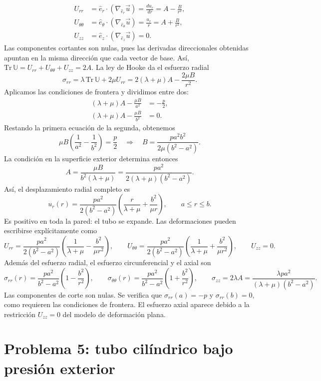 \documentclass[a4paper]{article}
\begin{document}
\[
\begin{aligned}
U_{rr}
&=\hat e_r\cdot\left(\nabla_{\hat e_r}\vec u\right)
=\frac{du_r}{dr}
=A-\frac{B}{r^2},\\
U_{\theta\theta}
&=\hat e_\theta\cdot\left(\nabla_{\hat e_\theta}\vec u\right)
=\frac{u_r}{r}
=A+\frac{B}{r^2},\\
U_{zz}
&=\hat e_z\cdot\left(\nabla_{\hat e_z}\vec u\right)=0.
\end{aligned}
\]
Las componentes cortantes son nulas, pues las derivadas direccionales obtenidas apuntan en la misma dirección que cada vector de base. Así, $\mathrm{Tr}\,\mathbb U=U_{rr}+U_{\theta\theta}+U_{zz}=2A$. La ley de Hooke da el esfuerzo radial
\[
\sigma_{rr}
=\lambda\,\mathrm{Tr}\,\mathbb U+2\mu U_{rr}
=2(\lambda+\mu)A-\frac{2\mu B}{r^2}.
\]
Aplicamos las condiciones de frontera y dividimos entre dos:
\[
\begin{aligned}
(\lambda+\mu)A-\frac{\mu B}{a^2}&=-\frac{p}{2},\\
(\lambda+\mu)A-\frac{\mu B}{b^2}&=0.
\end{aligned}
\]
Restando la primera ecuación de la segunda, obtenemos
\[
\mu B\left(\frac{1}{a^2}-\frac{1}{b^2}\right)
=\frac{p}{2}
\quad\Longrightarrow\quad
B=\frac{pa^2b^2}{2\mu(b^2-a^2)}.
\]
La condición en la superficie exterior determina entonces
\[
A=\frac{\mu B}{b^2(\lambda+\mu)}
=\frac{pa^2}{2(\lambda+\mu)(b^2-a^2)}.
\]
Así, el desplazamiento radial completo es
\[
\boxed{
u_r(r)=\frac{pa^2}{2(b^2-a^2)}
\left(\frac{r}{\lambda+\mu}+\frac{b^2}{\mu r}\right),
\qquad a\le r\le b.
}
\]
Es positivo en toda la pared: el tubo se expande. Las deformaciones pueden escribirse explícitamente como
\[
\boxed{
U_{rr}=\frac{pa^2}{2(b^2-a^2)}
\left(\frac{1}{\lambda+\mu}-\frac{b^2}{\mu r^2}\right),
\qquad
U_{\theta\theta}=\frac{pa^2}{2(b^2-a^2)}
\left(\frac{1}{\lambda+\mu}+\frac{b^2}{\mu r^2}\right),
\qquad U_{zz}=0.
}
\]
Además del esfuerzo radial, el esfuerzo circunferencial y el axial son
\[
\boxed{
\sigma_{rr}(r)=\frac{pa^2}{b^2-a^2}
\left(1-\frac{b^2}{r^2}\right),
\qquad
\sigma_{\theta\theta}(r)=\frac{pa^2}{b^2-a^2}
\left(1+\frac{b^2}{r^2}\right),
\qquad
\sigma_{zz}=2\lambda A
=\frac{\lambda pa^2}{(\lambda+\mu)(b^2-a^2)}.
}
\]
Las componentes de corte son nulas. Se verifica que $\sigma_{rr}(a)=-p$ y $\sigma_{rr}(b)=0$, como requieren las condiciones de frontera. El esfuerzo axial aparece debido a la restricción $U_{zz}=0$ del modelo de deformación plana.



\section{Problema 5: tubo cilíndrico bajo presión exterior}
\end{document}
